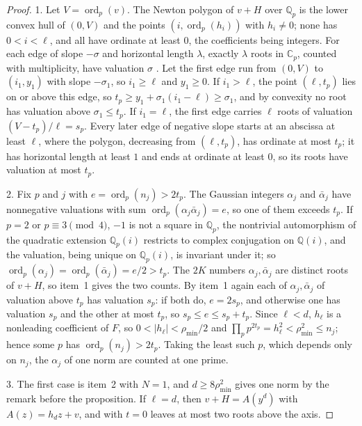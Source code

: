 \documentclass[11pt]{article}
\begin{document}
\begin{proof}
1.  Let $V=\operatorname{ord}_p(v)$.  The Newton polygon of $v+H$ over
$\mathbb Q_p$ is the lower convex hull of $(0,V)$ and the points
$(i,\operatorname{ord}_p(h_i))$ with $h_i\ne0$; none has $0<i<\ell$, and all
have ordinate at least $0$, the coefficients being integers.  For each edge
of slope $-\sigma$ and horizontal length $\lambda$, exactly $\lambda$ roots
in $\mathbb C_p$, counted with multiplicity, have valuation $\sigma$
\cite[Chapter~II, Proposition~6.3]{neukirch}.  Let the first edge run from
$(0,V)$ to $(i_1,y_1)$ with slope $-\sigma_1$, so $i_1\ge\ell$ and $y_1\ge0$.
If $i_1>\ell$, the point $(\ell,t_p)$ lies on or above this edge, so
$t_p\ge y_1+\sigma_1(i_1-\ell)\ge\sigma_1$, and by convexity no root has
valuation above $\sigma_1\le t_p$.  If $i_1=\ell$, the first edge carries
$\ell$ roots of valuation $(V-t_p)/\ell=s_p$.  Every later edge of negative
slope starts at an abscissa at least $\ell$, where the polygon, decreasing
from $(\ell,t_p)$, has ordinate at most $t_p$; it has horizontal length at
least $1$ and ends at ordinate at least $0$, so its roots have valuation at
most $t_p$.

2.  Fix $p$ and $j$ with $e=\operatorname{ord}_p(n_j)>2t_p$.  The Gaussian
integers $\alpha_j$ and $\bar\alpha_j$ have nonnegative valuations with sum
$\operatorname{ord}_p(\alpha_j\bar\alpha_j)=e$, so one of them exceeds
$t_p$.  If $p=2$ or $p\equiv3\pmod4$, $-1$ is not a square in $\mathbb Q_p$,
the nontrivial automorphism of the quadratic extension $\mathbb Q_p(i)$
restricts to complex conjugation on $\mathbb Q(i)$, and the valuation, being
unique on $\mathbb Q_p(i)$, is invariant under it; so
$\operatorname{ord}_p(\alpha_j)=\operatorname{ord}_p(\bar\alpha_j)=e/2>t_p$.
The $2K$ numbers $\alpha_j,\bar\alpha_j$ are distinct roots of $v+H$, so
item~1 gives the two counts.  By item~1 again each of
$\alpha_j,\bar\alpha_j$ of valuation above $t_p$ has valuation $s_p$: if
both do, $e=2s_p$, and otherwise one has valuation $s_p$ and the other at
most $t_p$, so $s_p\le e\le s_p+t_p$.  Since $\ell<d$, $h_\ell$ is a
nonleading coefficient of $F$, so $0<|h_\ell|<\rho_{\min}/2$ and
$\prod_pp^{2t_p}=h_\ell^2<\rho_{\min}^2\le n_j$; hence some $p$ has
$\operatorname{ord}_p(n_j)>2t_p$.  Taking the least such $p$, which depends
only on $n_j$, the $\alpha_j$ of one norm are counted at one prime.

3.  The first case is item~2 with $N=1$, and $d\ge8\rho_{\min}^2$ gives one
norm by the remark before the proposition.  If $\ell=d$, then
$v+H=A(y^d)$ with $A(z)=h_dz+v$, and \cite[Lemma~5.1]{coefficient-mass-sectors} with $t=0$
leaves at most two roots above the axis.
\end{proof}
\end{document}
